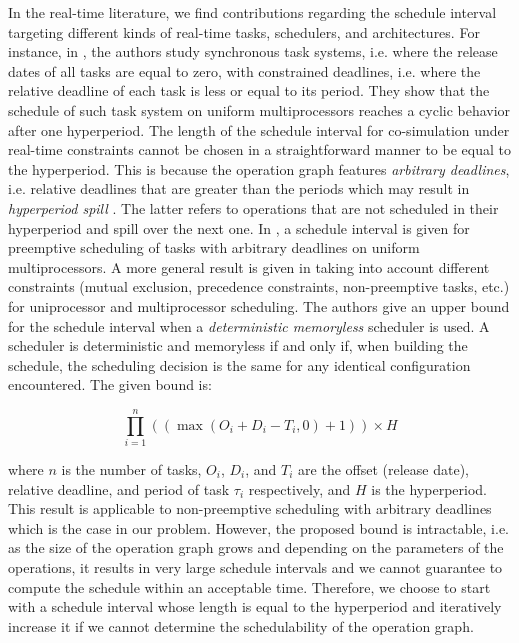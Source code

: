 In the real-time literature, we find contributions regarding the schedule interval targeting different kinds of real-time tasks, schedulers, and architectures. For instance, in \cite{cucu:2006}, the authors study synchronous task systems, i.e. where the release dates of all tasks are equal to zero, with constrained deadlines, i.e. where the relative deadline of each task is less or equal to its period. They show that the schedule of such task system on uniform multiprocessors reaches a cyclic behavior after one hyperperiod. The length of the schedule interval for co-simulation under real-time constraints cannot be chosen in a straightforward manner to be equal to the hyperperiod. This is because the operation graph features \textit{arbitrary deadlines}, i.e. relative deadlines that are greater than the periods which may result in \textit{hyperperiod spill} \cite{dave:1999}. The latter refers to operations that are not scheduled in their hyperperiod and spill over the next one. In \cite{cucu:2007}, a schedule interval is given for preemptive scheduling of tasks with arbitrary deadlines on uniform multiprocessors. A more general result is given in \cite{grolleau:2013} taking into account different constraints (mutual exclusion, precedence constraints, non-preemptive tasks, etc.) for uniprocessor and multiprocessor scheduling. The authors give an upper bound for the schedule interval when a \textit{deterministic memoryless} scheduler is used. A scheduler is deterministic and memoryless if and only if, when building the schedule, the scheduling decision is the same for any identical configuration encountered. The given bound is:

\begin{equation} 
\prod_{i=1}^n((\max(O_i + D_i - T_i, 0) + 1)) \times H
\end{equation}

where $n$ is the number of tasks, $O_i$, $D_i$, and $T_i$ are the offset (release date), relative deadline, and period of task $\tau_i$ respectively, and $H$ is the hyperperiod. This result is applicable to non-preemptive scheduling with arbitrary deadlines which is the case in our problem. However, the proposed bound is intractable, i.e. as the size of the operation graph grows and depending on the parameters of the operations, it results in very large schedule intervals and we cannot guarantee to compute the schedule within an acceptable time. Therefore, we choose to start with a schedule interval whose length is equal to the hyperperiod and iteratively increase it if we cannot determine the schedulability of the operation graph.


